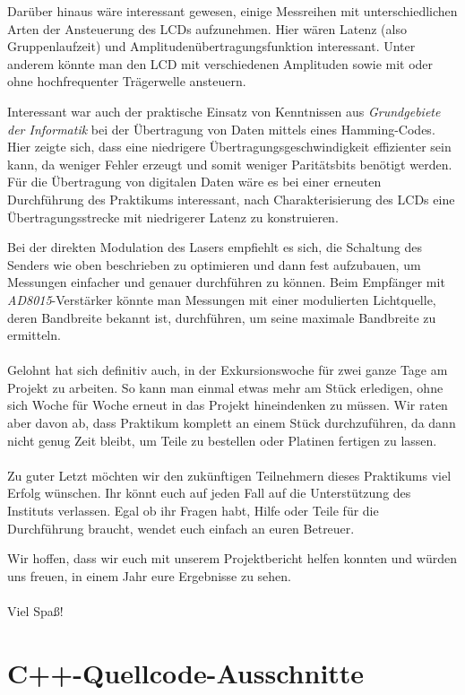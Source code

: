 \documentclass[12pt,a4paper]{article}
\newcommand{\rom}[1]{\uppercase\expandafter{\romannumeral #1\relax}}
\begin{document}
Darüber hinaus wäre interessant gewesen, einige Messreihen mit unterschiedlichen Arten der Ansteuerung des LCDs aufzunehmen. Hier wären Latenz (also Gruppenlaufzeit) und Amplitudenübertragungsfunktion interessant. Unter anderem könnte man den LCD mit verschiedenen Amplituden sowie mit oder ohne hochfrequenter Trägerwelle ansteuern.

Interessant war auch der praktische Einsatz von Kenntnissen aus \textit{Grundgebiete der Informatik \rom{2}} bei der Übertragung von Daten mittels eines Hamming-Codes. Hier zeigte sich, dass eine niedrigere Übertragungsgeschwindigkeit effizienter sein kann, da weniger Fehler erzeugt und somit weniger Paritätsbits benötigt werden. Für die Übertragung von digitalen Daten wäre es bei einer erneuten Durchführung des Praktikums interessant, nach Charakterisierung des LCDs eine Übertragungsstrecke mit niedrigerer Latenz zu konstruieren.

Bei der direkten Modulation des Lasers empfiehlt es sich, die Schaltung des Senders wie oben beschrieben zu optimieren und dann fest aufzubauen, um Messungen einfacher und genauer durchführen zu können. Beim Empfänger mit \textit{AD8015}-Verstärker könnte man Messungen mit einer modulierten Lichtquelle, deren Bandbreite bekannt ist, durchführen, um seine maximale Bandbreite zu ermitteln.
\\\\
Gelohnt hat sich definitiv auch, in der Exkursionswoche für zwei ganze Tage am Projekt zu arbeiten. So kann man einmal etwas mehr am Stück erledigen, ohne sich Woche für Woche erneut in das Projekt hineindenken zu müssen. Wir raten aber davon ab, dass Praktikum komplett an einem Stück durchzuführen, da dann nicht genug Zeit bleibt, um Teile zu bestellen oder Platinen fertigen zu lassen.
\\\\
Zu guter Letzt möchten wir den zukünftigen Teilnehmern dieses Praktikums viel Erfolg wünschen. Ihr könnt euch auf jeden Fall auf die Unterstützung des Instituts verlassen. Egal ob ihr Fragen habt, Hilfe oder Teile für die Durchführung braucht, wendet euch einfach an euren Betreuer.

Wir hoffen, dass wir euch mit unserem Projektbericht helfen konnten und würden uns freuen, in einem Jahr eure Ergebnisse zu sehen.
\\\\
Viel Spaß!

\appendix
\section{C++-Quellcode-Ausschnitte}
\label{app:code}
\end{document}
